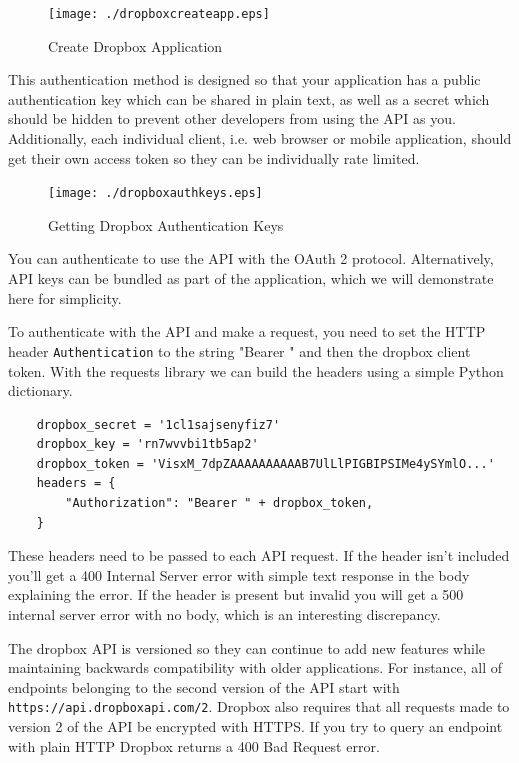 \documentclass[12pt]{article}
\begin{document}
\begin{figure}[!ht]
\centering
\texttt{[image: ./dropboxcreateapp.eps]}
\caption{Create Dropbox Application}
\end{figure}



This authentication method is designed so that your application has a public authentication key which can be shared in plain text, as well as a secret which should be hidden to prevent other developers from using the API as you. Additionally, each individual client, i.e. web browser or mobile application, should get their own access token so they can be individually rate limited.

\begin{figure}[!ht]
\centering
\texttt{[image: ./dropboxauthkeys.eps]}
\caption{Getting Dropbox Authentication Keys}
\end{figure}


You can authenticate to use the API with the OAuth 2 protocol. Alternatively, API keys can be bundled as part of the application, which we will demonstrate here for simplicity.

To authenticate with the API and make a request, you need to set the HTTP header \texttt{Authentication} to the string "Bearer " and then the dropbox client token. With the requests library we can build the headers using a simple Python dictionary.

\begin{lstlisting}
    dropbox_secret = '1cl1sajsenyfiz7'
    dropbox_key = 'rn7wvvbi1tb5ap2'
    dropbox_token = 'VisxM_7dpZAAAAAAAAAAB7UlLlPIGBIPSIMe4ySYmlO...'
    headers = {
        "Authorization": "Bearer " + dropbox_token,
    }
\end{lstlisting}

These headers need to be passed to each API request. If the header isn't included you'll get a 400 Internal Server error with simple text response in the body explaining the error. If the header is present but invalid you will get a 500 internal server error with no body, which is an interesting discrepancy.

The dropbox API is versioned so they can continue to add new features while maintaining backwards compatibility with older applications. For instance, all of endpoints belonging to the second version of the API start with \texttt{https://api.dropboxapi.com/2}. Dropbox also requires that all requests made to version 2 of the API be encrypted with HTTPS. If you try to query an endpoint with plain HTTP Dropbox returns a 400 Bad Request error.
\end{document}

